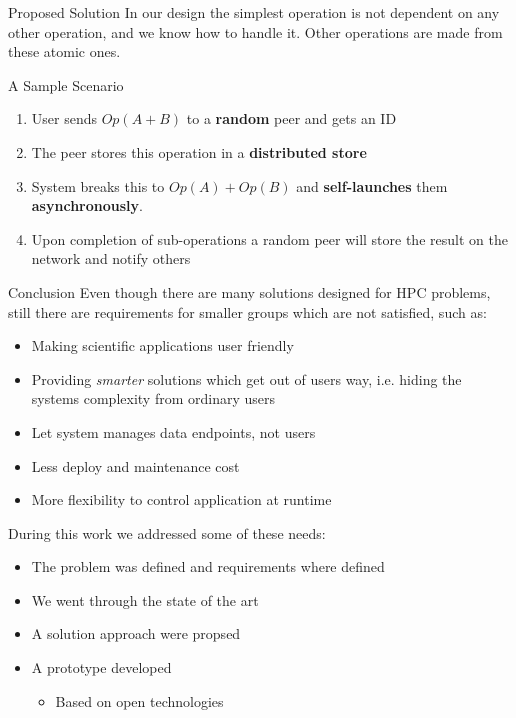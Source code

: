 \documentclass[final,hyperref={pdfpagelabels=true}]{beamer}
\begin{document}
\begin{frame}
\begin{columns}[t]
\begin{column}{.45\textwidth}
\begin{block}{Proposed Solution}
      In our design the simplest operation is not dependent on any other operation, and we know how to handle it. Other operations are made from these atomic ones.
      
      \end{block}

      \begin{block}{A Sample Scenario}
      \begin{enumerate}
      \item User sends \(Op(A + B) \) to a \textbf{random} peer and gets an ID
      \item The peer stores this operation in a \textbf{distributed store}
      \item System breaks this to \(Op(A) + Op(B) \) and \textbf{self-launches} them \textbf{asynchronously}.
      \item Upon completion of sub-operations a random peer will store the result on the network and notify others
      \end{enumerate}
      \end{block}
	  \begin{block}{Conclusion}
	  Even though there are many solutions designed for HPC problems, still there are requirements for smaller groups which are not satisfied, such as:
	  \begin{itemize}
	  \item Making scientific applications user friendly 
	  \item Providing \textit{smarter} solutions which get out of users way, i.e. hiding the systems complexity from ordinary users
	  \item Let system manages data endpoints, not users
	  \item Less deploy and maintenance cost
	  \item More flexibility to control application at runtime
	  \end{itemize}
	  During this work we addressed some of these needs:
	  \begin{itemize}
	  \item The problem was defined and requirements where defined
	  \item We went through the state of the art
	  \item A solution approach were propsed
	  \item A prototype developed
	  \begin{itemize}
	  \fontsize{27pt}{28}\selectfont
	  \item Based on open technologies

\end{itemize}
\end{itemize}
\end{block}
\end{column}
\end{columns}
\end{frame}
\end{document}
